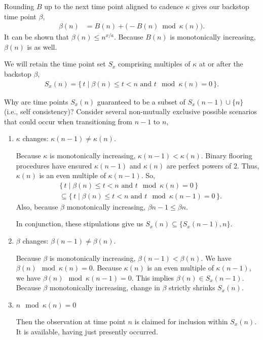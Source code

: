 Rounding $B$ up to the next time point aligned to cadence $\kappa$ gives our backstop time point $\beta$,
\begin{align*}
  \beta(n)
  &=
  B(n) + \big(-B(n) \bmod \kappa(n)\big).
\end{align*}
It can be shown that $\beta(n) \leq n^{x/a}$.
Because $B(n)$ is monotonically increasing, $\beta(n)$ is as well.

We will retain the time point set $S_x$ comprising multiples of $\kappa$ at or after the backstop $\beta$,
\begin{align*}
  S_x(n) = \{\, t \mid \beta(n) \leq t < n \text{ and } t \mod \kappa(n) = 0 \,\}.
\end{align*}

Why are time points $S_x(n)$ guaranteed to be a subset of $S_x(n-1) \cup \{n\}$ (i.e., self consistency)?
Consider several non-mutually exclusive possible scenarios that could occur when transitioning from $n - 1$ to $n$,
\begin{enumerate}
  \item $\kappa$ changes: $\kappa(n - 1) \neq \kappa(n)$.

  Because $\kappa$ is monotonically increasing, $\kappa(n - 1) < \kappa(n)$.
  Binary flooring procedures have ensured $\kappa(n - 1)$ and $\kappa(n)$ are perfect powers of 2.
  Thus, $\kappa(n)$ is an even multiple of $\kappa(n - 1)$.
  So,
  \begin{align*}
    &\{\, t \mid \beta(n) \leq t < n \text{ and } t \mod \kappa(n) = 0 \,\}\\
    &\subseteq \{\, t \mid \beta(n) \leq t < n \text{ and } t \mod \kappa(n - 1) = 0 \,\}.
  \end{align*}
  Also, because $\beta$ monotonically increasing, $\beta{n - 1} \leq \beta{n}$.
  
  In conjunction, these stipulations give us $S_x(n) \subseteq \{S_x(n - 1), n\}$.

  \item $\beta$ changes: $\beta(n - 1) \neq \beta(n)$.

  Because $\beta$ is monotonically increasing, $\beta(n - 1) < \beta(n)$.
  We have $\beta(n) \mod \kappa(n) = 0$.
  Because $\kappa(n)$ is an even multiple of $\kappa(n - 1)$, we have $\beta(n) \mod \kappa(n - 1) = 0$.
  This implies $\beta(n) \in S_x(n - 1)$.
  Because $\beta$ monotonically increasing, change in $\beta$ strictly shrinks $S_x(n)$.

  \item $n \mod \kappa(n) = 0$

  Then the observation at time point $n$ is claimed for inclusion within $S_x(n)$.
  It is available, having just presently occurred.

\end{enumerate}

